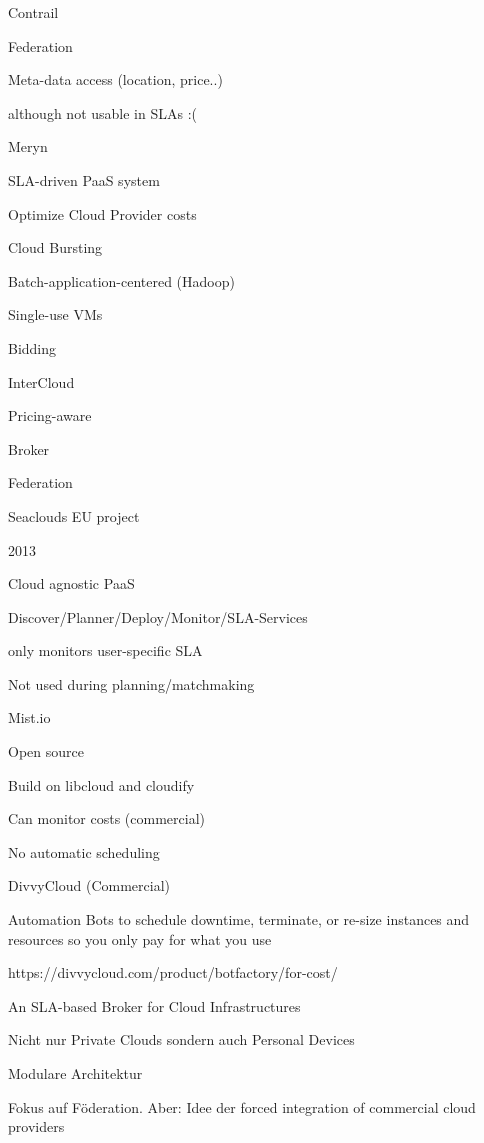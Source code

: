 Contrail 

Federation 

Meta-data access (location, price..) 

although not usable in SLAs  :( 



Meryn 

SLA-driven PaaS system 

Optimize Cloud Provider costs 

Cloud Bursting 

Batch-application-centered (Hadoop) 

Single-use VMs 

Bidding 



InterCloud 

Pricing-aware 

Broker 

Federation 



Seaclouds EU project 

2013 

Cloud agnostic PaaS 

Discover/Planner/Deploy/Monitor/SLA-Services 

only monitors user-specific SLA 

Not used during planning/matchmaking 



Mist.io 

Open source 

Build on libcloud and cloudify 

Can monitor costs (commercial) 

No automatic scheduling 



DivvyCloud (Commercial) 

Automation Bots to schedule downtime, terminate, or re-size instances and resources so you only pay for what you use 

https://divvycloud.com/product/botfactory/for-cost/ 


An SLA-based Broker for Cloud Infrastructures 



Nicht nur Private Clouds sondern auch Personal Devices 



Modulare Architektur 



Fokus auf Föderation. Aber: Idee der forced integration of commercial cloud providers 

